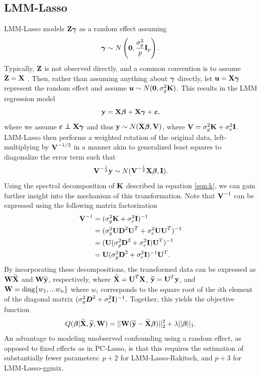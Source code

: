 \subsection{LMM-Lasso}
LMM-Lasso models $\textbf{Z}\boldsymbol{\gamma}$ as a random effect assuming 
$$\boldsymbol{\gamma} \sim N\left(\boldsymbol{0}, \frac{\sigma^2_g}{p} \textbf{I}_p \right).$$  Typically, $\textbf{Z}$ is not observed directly, and a common convention is to assume $\textbf{Z} = \textbf{X}$ \cite{wang2018multiplex, lippert2011fast, yang2014advantages}. Then, rather than assuming anything about $\boldsymbol{\gamma}$ directly, let $\textbf{u}=\textbf{X}\boldsymbol{\gamma}$ represent the random effect and assume $\boldsymbol{u} \sim N(\boldsymbol{0}, \sigma^2_g \textbf{K})$. This results in the LMM regression model
\begin{equation}
    \label{eqn:lmm_reg}
    \textbf{y} = \textbf{X}\boldsymbol{\beta} + \textbf{X}\boldsymbol{\gamma}+ \boldsymbol{\varepsilon},
\end{equation}
where we assume $\beps \independent \bX\bgamma$ and thus $\textbf{y}  \sim N(\textbf{X} \boldsymbol{\beta}, \textbf{V})$, where $\textbf{V} = \sigma^2_g \textbf{K} + \sigma^2_e \textbf{I}$. LMM-Lasso then performs a weighted rotation of the original data, left-multiplying by $\textbf{V}^{-1/2}$ in a manner akin to generalized least squares to diagonalize the error term such that
\begin{equation}
\textbf{V}^{-\frac{1}{2}}\textbf{y} \sim N(\textbf{V}^{-\frac{1}{2}}\textbf{X} \boldsymbol{\beta}, \textbf{I}).
\end{equation}
Using the spectral decomposition of $\textbf{K}$ described in equation \eqref{eqn:k}, we can gain further insight into the mechanism of this transformation. Note that $\textbf{V}^{-1}$ can be expressed using the following matrix factorization  
\begin{align*}
    \textbf{V}^{-1} &= (\sigma^2_g \textbf{K} + \sigma^2_e \textbf{I})^{-1}\\
    &=(\sigma^2_g \textbf{U} \textbf{D}^2 \textbf{U}^T + \sigma^2_e \textbf{U} \textbf{U}^T)^{-1}\\
    &= (\textbf{U} (\sigma^2_g \textbf{D}^2 + \sigma^2_e \textbf{I}) \textbf{U}^T)^{-1}\\
    &=\textbf{U} (\sigma^2_g \textbf{D}^2 + \sigma^2_e \textbf{I})^{-1} \textbf{U}^T.
\end{align*}
By incorporating these decompositions, the transformed data can be expressed as $\textbf{W} \widetilde{\textbf{X}}$ and $\textbf{W} \widetilde{\textbf{y}}$, respectively, where $\widetilde{\textbf{X}} = \textbf{U}^T \textbf{X}$, $\widetilde{\textbf{y}} = \textbf{U}^T \textbf{y}$, and $\textbf{W} = \text{diag}\{w_1, ... w_n\}$ where $w_i$ corresponds to the square root of the $i$th element of the diagonal matrix $(\sigma^2_g \boldsymbol{D}^2 + \sigma^2_e \textbf{I})^{-1}$. Together, this yields the objective function
\begin{equation}
\label{eqn:lmm_obj}
Q(\boldsymbol{\beta} | \widetilde{\textbf{X}}, \widetilde{\textbf{y}}, \textbf{W}) = || \textbf{W} (\widetilde{\textbf{y}} - \widetilde{\textbf{X}} \boldsymbol{\beta})||_2^2 + \lambda || \boldsymbol{\beta} ||_1.
\end{equation}
An advantage to modeling unobserved confounding using a random effect, as opposed to fixed effects as in PC-Lasso, is that this requires the estimation of substantially fewer parameters: $p + 2$ for LMM-Lasso-Rakitsch, and $p + 3$ for LMM-Lasso-ggmix. 


